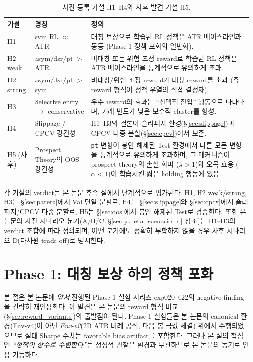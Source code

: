 \documentclass[11pt, a4paper]{article}
\begin{document}
\begin{table}[!htbp]
\centering
\small
\caption{사전 등록 가설 H1--H4와 사후 발견 가설 H5.}
\begin{tabular}{p{1.8cm}p{5cm}p{6.5cm}}
\toprule
가설 & 명칭 & 정의 \\
\midrule
H1 & sym RL $\approx$ ATR & 대칭 보상으로 학습된 RL 정책은 ATR 베이스라인과 동등 (Phase 1 정책 포화의 일반화). \\
H2 weak & asym/dsr/pt $>$ ATR & 비대칭 또는 위험 조정 reward로 학습된 RL 정책은 ATR 베이스라인을 통계적으로 유의하게 초과. \\
H2 strong & asym/dsr/pt $>$ sym & 비대칭/위험 조정 reward가 대칭 reward를 초과 (즉 reward 형식이 정책 우열의 직접 결정자). \\
H3 & Selective entry $\to$ conservative & 우수 reward의 효과는 ``선택적 진입'' 행동으로 나타나며, 거래 빈도가 낮은 보수적 cluster를 형성. \\
H4 & Slippage / CPCV 강건성 & H1--H3의 결론이 슬리피지 환경(\S\ref{sec:slippage})과 CPCV 다중 분할(\S\ref{sec:cpcv})에서 보존. \\
\midrule
H5 (사후) & Prospect Theory의 OOS 강건성 & \texttt{pt} 변형이 봉인 해제된 Test 환경에서 다른 모든 변형을 통계적으로 유의하게 초과하며, 그 메커니즘이 prospect theory의 손실 회피 ($\lambda > 1$)와 오목 효용 ($\alpha < 1$)이 학습시킨 짧은 holding 행동에 있음. \\
\bottomrule
\end{tabular}
\label{tab:hypotheses}
\end{table}

각 가설의 verdict는 본 논문 후속 절에서 단계적으로 평가된다. H1, H2 weak/strong,
H3는 \S\ref{sec:pareto}에서 Val 단일 분할로, H4는 \S\ref{sec:slippage}와
\S\ref{sec:cpcv}에서 슬리피지/CPCV 다중 분할로, H5는 \S\ref{sec:oos}에서 봉인 해제된
Test로 검증한다. 또한 본 논문의 사전 시나리오 분기(A/B/C: \S\ref{sec:pareto_scenario_d}
참조)는 H1--H3의 verdict 조합에 따라 정의되며, 어떤 분기에도 정확히 부합하지 않을
경우 사후 시나리오 D(다차원 trade-off)로 명시한다.

\section{Phase 1: 대칭 보상 하의 정책 포화}
\label{sec:phase1_negative}

본 절은 본 논문에 \emph{앞서} 진행된 Phase 1 실험 시리즈
exp020--022의 negative finding을 간략히 재인용한다. 이 발견은 본 논문의 reward
형식 비교(\S\ref{sec:reward_variants})의 출발점이 된다. Phase 1
실험들은 본 논문의 canonical 환경(Env-v4)이 아닌 \emph{Env-v2}(2D ATR 비례
공식, 다음 봉 극값 체결) 위에서 수행되었으므로 절대 Sharpe 수치는 favorable
bias artifact를 포함한다. 그러나 본 절의 핵심인 \emph{``정책이 상수로
수렴한다''}는 정성적 관찰은 환경과 무관하므로 본 논문의 동기로 인용 가능하다.
\end{document}
